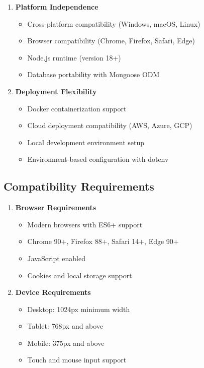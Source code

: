 \documentclass[12pt,a4paper]{report}
\begin{document}
\begin{enumerate}[leftmargin=*]
    \item \textbf{Platform Independence}
    \begin{itemize}
        \item Cross-platform compatibility (Windows, macOS, Linux)
        \item Browser compatibility (Chrome, Firefox, Safari, Edge)
        \item Node.js runtime (version 18+)
        \item Database portability with Mongoose ODM
    \end{itemize}
    
    \item \textbf{Deployment Flexibility}
    \begin{itemize}
        \item Docker containerization support
        \item Cloud deployment compatibility (AWS, Azure, GCP)
        \item Local development environment setup
        \item Environment-based configuration with dotenv
    \end{itemize}
\end{enumerate}

\subsection{Compatibility Requirements}

\begin{enumerate}[leftmargin=*]
    \item \textbf{Browser Requirements}
    \begin{itemize}
        \item Modern browsers with ES6+ support
        \item Chrome 90+, Firefox 88+, Safari 14+, Edge 90+
        \item JavaScript enabled
        \item Cookies and local storage support
    \end{itemize}
    
    \item \textbf{Device Requirements}
    \begin{itemize}
        \item Desktop: 1024px minimum width
        \item Tablet: 768px and above
        \item Mobile: 375px and above
        \item Touch and mouse input support
    \end{itemize}
\end{enumerate}
\end{document}
